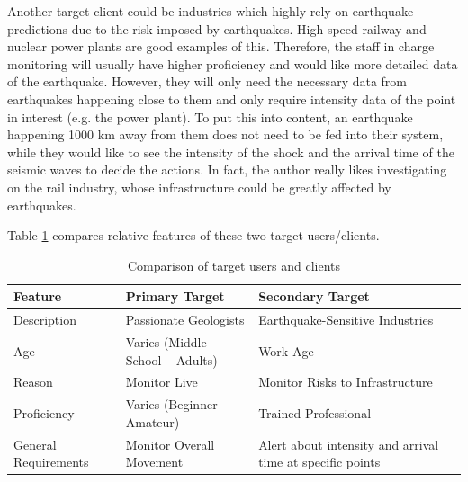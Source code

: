 \documentclass[10pt]{article}
\begin{document}
Another target client could be industries which highly rely on earthquake predictions due to the risk imposed by earthquakes. High-speed railway and nuclear power plants are good examples of this. Therefore, the staff in charge monitoring will usually have higher proficiency and would like more detailed data of the earthquake. However, they will only need the necessary data from earthquakes happening close to them and only require intensity data of the point in interest (e.g. the power plant). To put this into content, an earthquake happening 1000 km away from them does not need to be fed into their system, while they would like to see the intensity of the shock and the arrival time of the seismic waves to decide the actions. In fact, the author really likes investigating on the rail industry, whose infrastructure could be greatly affected by earthquakes.

Table \ref{table:users} compares relative features of these two target users/clients.

\begin{table}[!ht]
    \centering

    \begin{tabular}{|p{55pt}||p{145pt}|p{145pt}|}
        \hline
        Feature              & Primary Target                       & Secondary Target                                          \\
        \hline\hline
        Description          & Passionate Geologists                & Earthquake-Sensitive Industries                           \\
        \hline
        Age                  & Varies (Middle School -- Adults)     & Work Age                                                  \\
        \hline
        Reason               & Monitor Live \and Latest Earthquakes & Monitor Risks to Infrastructure                           \\
        \hline
        Proficiency          & Varies (Beginner -- Amateur)         & Trained Professional                                      \\
        \hline
        General Requirements & Monitor Overall Movement             & Alert about intensity and arrival time at specific points \\
        \hline
    \end{tabular}

    \caption{Comparison of target users and clients}
    \label{table:users}
\end{table}
\end{document}
